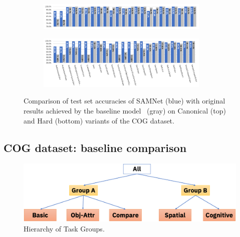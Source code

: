 \begin{figure}[htbp]
	\centering
	\begin{subfigure}{\textwidth}
		\centering
		\includegraphics[width=0.9\textwidth]{../results/samnet_cog_orig_canonical_no_labels.png}
	\end{subfigure}%
	\newline
	\begin{subfigure}{\textwidth}
		\centering
		\includegraphics[width=0.9\textwidth]{../results/samnet_cog_orig_hard.png}
	\end{subfigure}%
	\caption{Comparison of test set accuracies of SAMNet (blue) with original results achieved by the 
		baseline model~\cite{yang2018dataset} (gray) on Canonical (top) and Hard (bottom) variants of the COG dataset.}
	\label{fig:samnet_cog_detailed}
\end{figure}

\newpage
\subsection{COG dataset: baseline comparison}



\begin{figure}[htbp]
	\centering
	\includegraphics[width=\columnwidth]{../img/architecture/hierarchy}
	\caption{Hierarchy of Task Groups.}
	\label{fig:task-groups}
\end{figure}

